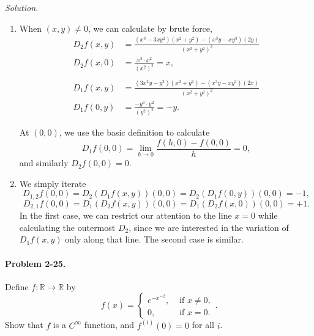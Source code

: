 \documentclass[11pt]{report}
\newcommand{\R}{\mathbb{R}}
\newcommand{\problem}[1]{\paragraph{Problem #1.}}
\newcommand{\solution}{\noindent\textit{Solution.} }
\begin{document}
    \solution \begin{enumerate}
        \item When $(x, y) \neq 0$, we can calculate by brute force, \begin{align*}
            D_2f(x, y) &= \frac{(x^3 - 3xy^2)(x^2 + y^2) - (x^3y - xy^3)(2y)}{(x^2 +
            y^2)^2} \\
            D_2f(x, 0) &= \frac{x^3\cdot x^2}{(x^2)^2} = x, \\ \\
            D_1f(x, y) &= \frac{(3x^2y - y^3)(x^2 + y^2) - (x^3y - xy^3)(2x)}{(x^2 +
            y^2)^2} \\
            D_1f(0, y) &= \frac{-y^3\cdot y^2}{(y^2)^2} = -y.
        \end{align*}

        At $(0, 0)$, we use the basic definition to calculate \[
            D_1f(0, 0) = \lim_{h \to 0} \frac{f(h, 0) - f(0, 0)}{h} = 0,
        \] and similarly $D_2f(0, 0) = 0$.

        \item We simply iterate \[
            D_{1, 2}f(0, 0) = D_2(D_1f(x, y))(0, 0) = D_2(D_1f(0, y))(0, 0) = -1,
        \] \[
            D_{2, 1}f(0, 0) = D_1(D_2f(x, y))(0, 0) = D_1(D_2f(x, 0))(0, 0) = +1.
        \] In the first case, we can restrict our attention to the line $x = 0$ while
        calculating the outermost $D_2$, since we are interested in the variation of
        $D_1f(x, y)$ only along that line. The second case is similar.
    \end{enumerate}


    \problem{2-25} Define $f\colon \R\to \R$ by \[
        f(x) = \begin{cases}
            e^{-x^{-2}}, &\text{ if }x \neq 0, \\
            0, &\text{ if }x = 0.
        \end{cases}.
    \] Show that $f$ is a $C^\infty$ function, and $f^{(i)}(0) = 0$ for all $i$. \\
\end{document}
